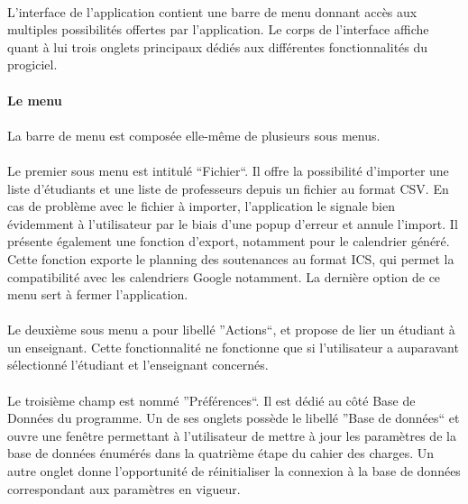 \documentclass[a4paper,10pt]{report}
\begin{document}
	\paragraph{}
	  L'interface de l'application contient une barre de menu donnant accès aux multiples possibilités offertes par l'application.
	  Le corps de l'interface affiche quant à lui trois onglets principaux dédiés aux différentes fonctionnalités du progiciel. 
	  
	\paragraph{Le menu}
	  \paragraph{}
	    La barre de menu est composée elle-même de plusieurs sous menus.
	  \paragraph{}
	    Le premier sous menu est intitulé ``Fichier``. Il offre la possibilité d'importer une liste d'étudiants et une liste de professeurs depuis un fichier au format CSV.
	    En cas de problème avec le fichier à importer, l'application le signale bien évidemment à l'utilisateur par le biais d'une popup d'erreur et annule l'import.
	    Il présente également une fonction d'export, notamment pour le calendrier généré. Cette fonction exporte le planning des soutenances au format ICS, qui permet la compatibilité avec les calendriers Google notamment.
	    La dernière option de ce menu sert à fermer l'application.
	  \paragraph{}
	    Le deuxième sous menu a pour libellé ''Actions``, et propose de lier un étudiant à un enseignant. 
	    Cette fonctionnalité ne fonctionne que si l'utilisateur a auparavant sélectionné l'étudiant et l'enseignant concernés.
	  \paragraph{}
	    Le troisième champ est nommé ''Préférences``.
	    Il est dédié au côté Base de Données du programme.
	    Un de ses onglets possède le libellé ''Base de données`` et ouvre une fenêtre permettant à l'utilisateur de mettre à jour les paramètres de la base de données énumérés dans la quatrième étape du cahier des charges. 
	    Un autre onglet donne l'opportunité de réinitialiser la connexion à la base de données correspondant aux paramètres en vigueur.
\end{document}
